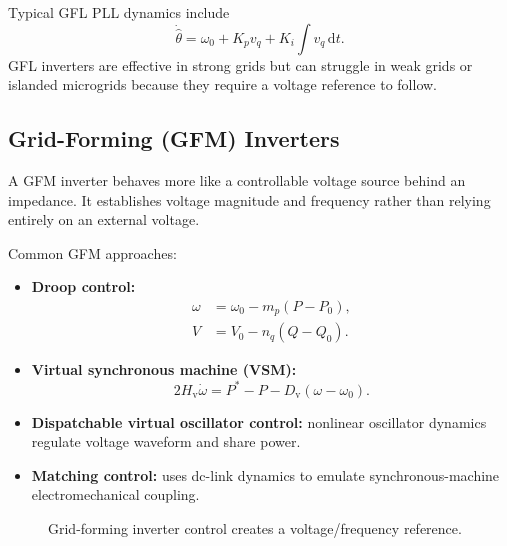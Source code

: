 \documentclass[11pt]{article}
\newcommand{\dd}{\mathrm{d}}
\begin{document}
Typical GFL PLL dynamics include
\begin{equation}
\dot{\hat{\theta}}=\omega_0+K_p v_q+K_i\int v_q\,\dd t.
\end{equation}
GFL inverters are effective in strong grids but can struggle in weak grids or
islanded microgrids because they require a voltage reference to follow.

\subsection{Grid-Forming (GFM) Inverters}
A GFM inverter behaves more like a controllable voltage source behind an
impedance. It establishes voltage magnitude and frequency rather than relying
entirely on an external voltage.

Common GFM approaches:
\begin{itemize}
  \item \textbf{Droop control:}
  \begin{align}
  \omega &= \omega_0-m_p(P-P_0),\\
  V &= V_0-n_q(Q-Q_0).
  \end{align}
  \item \textbf{Virtual synchronous machine (VSM):}
  \begin{equation}
  2H_{\mathrm{v}}\dot{\omega}=P^{*}-P-D_{\mathrm{v}}(\omega-\omega_0).
  \end{equation}
  \item \textbf{Dispatchable virtual oscillator control:} nonlinear oscillator
  dynamics regulate voltage waveform and share power.
  \item \textbf{Matching control:} uses dc-link dynamics to emulate
  synchronous-machine electromechanical coupling.
\end{itemize}

\begin{figure}[h]
\centering
{}
\caption{Grid-forming inverter control creates a voltage/frequency reference.}
\end{figure}
\end{document}
